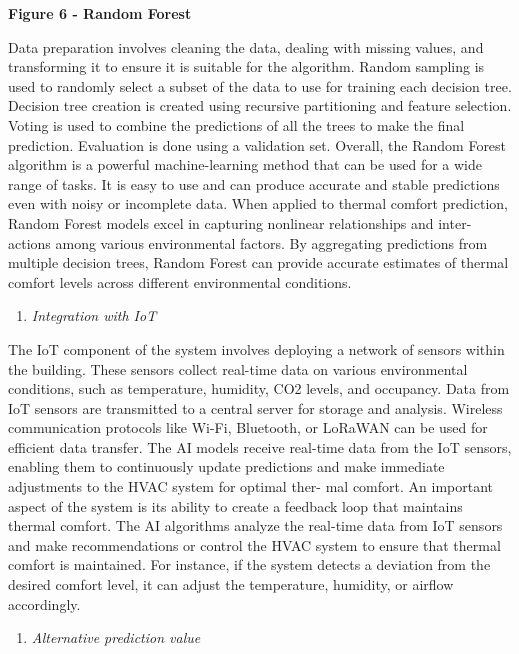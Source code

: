 {\bfseries Figure 6 - Random Forest}

Data preparation involves cleaning the data, dealing with missing
values, and transforming it to ensure it is suitable for the algorithm.
Random sampling is used to randomly select a subset of the data to use
for training each decision tree. Decision tree creation is created using
recursive partitioning and feature selection. Voting is used to combine
the predictions of all the trees to make the final prediction.
Evaluation is done using a validation set. Overall, the Random Forest
algorithm is a powerful machine-learning method that can be used for a
wide range of tasks. It is easy to use and can produce accurate and
stable predictions even with noisy or incomplete data. When applied to
thermal comfort prediction, Random Forest models excel in capturing
nonlinear relationships and inter- actions among various environmental
factors. By aggregating predictions from multiple decision trees, Random
Forest can provide accurate estimates of thermal comfort levels across
different environmental conditions.

\begin{enumerate}
\def\labelenumi{\Alph{enumi}.}
\setcounter{enumi}{7}
\item
  \emph{Integration with IoT}
\end{enumerate}

The IoT component of the system involves deploying a network of sensors
within the building. These sensors collect real-time data on various
environmental conditions, such as temperature, humidity, CO2 levels, and
occupancy. Data from IoT sensors are transmitted to a central server for
storage and analysis. Wireless communication protocols like Wi-Fi,
Bluetooth, or LoRaWAN can be used for efficient data transfer. The AI
models receive real-time data from the IoT sensors, enabling them to
continuously update predictions and make immediate adjustments to the
HVAC system for optimal ther- mal comfort. An important aspect of the
system is its ability to create a feedback loop that maintains thermal
comfort. The AI algorithms analyze the real-time data from IoT sensors
and make recommendations or control the HVAC system to ensure that
thermal comfort is maintained. For instance, if the system detects a
deviation from the desired comfort level, it can adjust the temperature,
humidity, or airflow accordingly.

\begin{enumerate}
\def\labelenumi{\Alph{enumi}.}
\setcounter{enumi}{8}
\item
  \emph{Alternative prediction value}
\end{enumerate}

